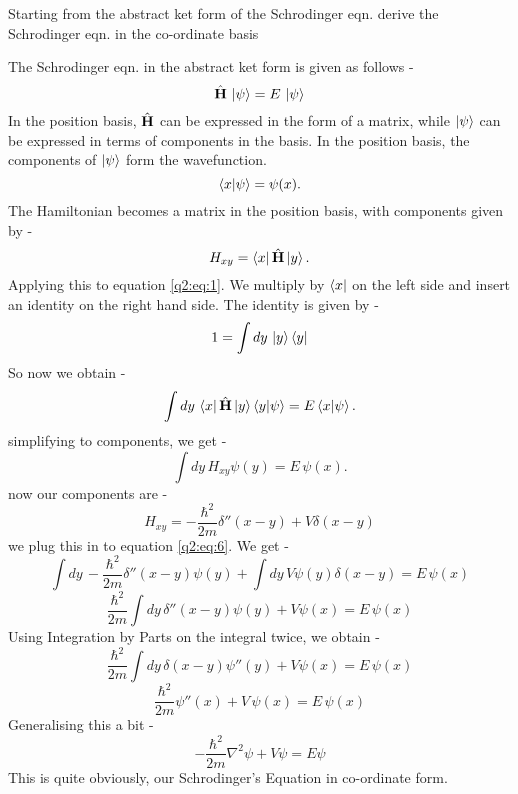 Starting from the abstract ket form of the Schrodinger eqn. derive the Schrodinger eqn. in the co-ordinate basis

The Schrodinger eqn. in the abstract ket form is given as follows -
    \begin{equation} \label{q2:eq:1}
        \hat{\textbf{H}} \, \ket{\psi} = E\, \ket{\psi}
    \end{equation}
In the position basis, $\hat{\textbf{H}}$ can be expressed in the form of a matrix, while $\ket{\psi}$ can be expressed in terms of components in the basis.
In the position basis, the components of $\ket{\psi}$ form the wavefunction.
    \begin{equation}
        \braket{x}{\psi} = \psi(x).
    \end{equation}
The Hamiltonian becomes a matrix in the position basis, with components given by -
    \begin{equation}
        H_{xy} = \bra{x}\hat{\textbf{H}}\ket{y}.
    \end{equation}
Applying this to equation \ref{q2:eq:1}. We multiply by $\bra{x}$ on the left side and insert an identity on the right hand side.
The identity is given by - 
    \begin{equation}
        1 = \int dy\, \ket{y}\bra{y}
    \end{equation}
So now we obtain - 
    \begin{equation}
        \int dy\, \bra{x}\hat{\textbf{H}}\ket{y}\braket{y}{\psi} = E \braket{x}{\psi}.
    \end{equation}
simplifying to components, we get -
    \begin{equation} \label{q2:eq:6}
        \int dy \, H_{xy} \psi(y) = E \, \psi(x).
    \end{equation}
now our components are - 
    \begin{equation}
        H_{xy} = -\frac{\hbar^2}{2m}\delta''(x-y) + V\delta(x-y)
    \end{equation}
we plug this in to equation \ref{q2:eq:6}. We get - 
    \begin{equation}
        \int dy \, -\frac{\hbar^2}{2m}\delta''(x-y) \psi(y) + \int dy \, V\psi(y)\delta(x-y) = E \, \psi(x)
    \end{equation}
    \begin{equation}
        \frac{\hbar^2}{2m} \int dy \, \delta''(x-y) \psi(y) + V \psi(x) = E\,  \psi(x)        
    \end{equation}
Using Integration by Parts on the integral twice, we obtain - 
    \begin{equation}
        \frac{\hbar^2}{2m} \int dy \, \delta(x-y) \psi''(y) + V \psi(x) = E\,  \psi(x)        
    \end{equation}
    \begin{equation}
        \frac{\hbar^2}{2m} \psi''(x) + V\, \psi(x) = E\,  \psi(x)        
    \end{equation}
Generalising this a bit - 
    \begin{equation}
        - \frac{\hbar^2}{2m} \nabla^2 \psi + V \psi = E \psi        
    \end{equation}
This is quite obviously, our Schrodinger's Equation in co-ordinate form.
